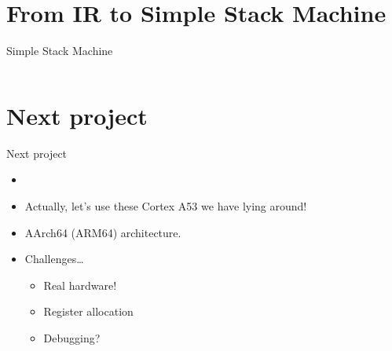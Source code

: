 \documentclass[department=icis, slidenumbers=slide, official=true]{beamerruhuisstijl}
\begin{document}
\section{From IR to Simple Stack Machine}
\begin{frame}{Simple Stack Machine}
    \fontsize{8pt}{9}\selectfont


    \begin{multicols}{3}
        \inputminted{Haskell}{examples/ssm.hs}
    \end{multicols}

\end{frame}


\section{Next project}
\begin{frame}{Next project}
    \begin{itemize}[<+->]
        \item
        \item
            Actually, let's use these Cortex A53 we have lying around!
        \item
            AArch64 (ARM64) architecture.
        \item
            Challenges\ldots
            \begin{itemize}[<+->]
                \item Real hardware!
                \item Register allocation
                \item Debugging?
            \end{itemize}
    \end{itemize}
\end{frame}
\end{document}
